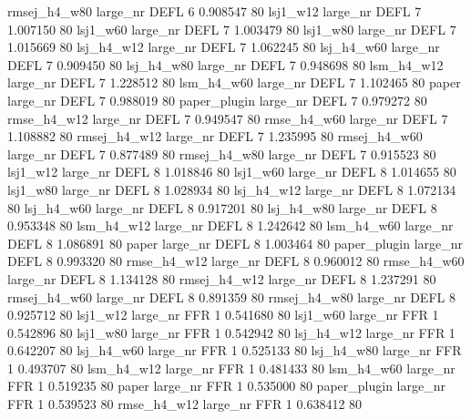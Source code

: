 rmsej_h4_w80   large_nr     DEFL                 6 0.908547 80
    lsj1_w12   large_nr     DEFL                 7 1.007150 80
    lsj1_w60   large_nr     DEFL                 7 1.003479 80
    lsj1_w80   large_nr     DEFL                 7 1.015669 80
  lsj_h4_w12   large_nr     DEFL                 7 1.062245 80
  lsj_h4_w60   large_nr     DEFL                 7 0.909450 80
  lsj_h4_w80   large_nr     DEFL                 7 0.948698 80
  lsm_h4_w12   large_nr     DEFL                 7 1.228512 80
  lsm_h4_w60   large_nr     DEFL                 7 1.102465 80
       paper   large_nr     DEFL                 7 0.988019 80
paper_plugin   large_nr     DEFL                 7 0.979272 80
 rmse_h4_w12   large_nr     DEFL                 7 0.949547 80
 rmse_h4_w60   large_nr     DEFL                 7 1.108882 80
rmsej_h4_w12   large_nr     DEFL                 7 1.235995 80
rmsej_h4_w60   large_nr     DEFL                 7 0.877489 80
rmsej_h4_w80   large_nr     DEFL                 7 0.915523 80
    lsj1_w12   large_nr     DEFL                 8 1.018846 80
    lsj1_w60   large_nr     DEFL                 8 1.014655 80
    lsj1_w80   large_nr     DEFL                 8 1.028934 80
  lsj_h4_w12   large_nr     DEFL                 8 1.072134 80
  lsj_h4_w60   large_nr     DEFL                 8 0.917201 80
  lsj_h4_w80   large_nr     DEFL                 8 0.953348 80
  lsm_h4_w12   large_nr     DEFL                 8 1.242642 80
  lsm_h4_w60   large_nr     DEFL                 8 1.086891 80
       paper   large_nr     DEFL                 8 1.003464 80
paper_plugin   large_nr     DEFL                 8 0.993320 80
 rmse_h4_w12   large_nr     DEFL                 8 0.960012 80
 rmse_h4_w60   large_nr     DEFL                 8 1.134128 80
rmsej_h4_w12   large_nr     DEFL                 8 1.237291 80
rmsej_h4_w60   large_nr     DEFL                 8 0.891359 80
rmsej_h4_w80   large_nr     DEFL                 8 0.925712 80
    lsj1_w12   large_nr      FFR                 1 0.541680 80
    lsj1_w60   large_nr      FFR                 1 0.542896 80
    lsj1_w80   large_nr      FFR                 1 0.542942 80
  lsj_h4_w12   large_nr      FFR                 1 0.642207 80
  lsj_h4_w60   large_nr      FFR                 1 0.525133 80
  lsj_h4_w80   large_nr      FFR                 1 0.493707 80
  lsm_h4_w12   large_nr      FFR                 1 0.481433 80
  lsm_h4_w60   large_nr      FFR                 1 0.519235 80
       paper   large_nr      FFR                 1 0.535000 80
paper_plugin   large_nr      FFR                 1 0.539523 80
 rmse_h4_w12   large_nr      FFR                 1 0.638412 80
